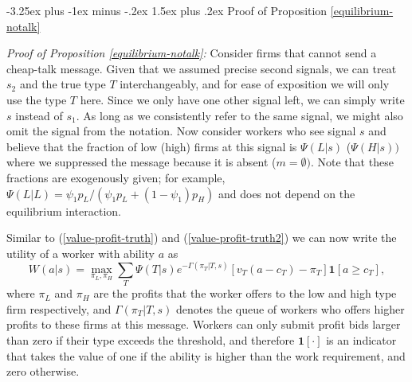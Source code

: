 \documentclass[12pt]{article}
\makeatletter
\renewcommand{\subsection}{%
  \@startsection{subsection}{2}{\z@}%
  {-3.25ex plus -1ex minus -.2ex}%
  {1.5ex plus .2ex}%
  {\normalfont\large\bfseries}%
}
\makeatother
\begin{document}
\subsection{Proof of Proposition \ref{equilibrium-notalk}}\label{online_app:proof_notalk}

\noindent \textit{Proof of Proposition \ref{equilibrium-notalk}:} Consider firms that
cannot send a cheap-talk message. Given that we assumed precise second
signals, we can treat $s_{2}$ and the true type $T$ interchangeably, and for
ease of exposition we will only use the type $T$ here. Since we only have
one other signal left, we can simply write $s$ instead of $s_{1}.$ As long
as we consistently refer to the same signal, we might also omit the signal
from the notation. Now consider workers who see signal $s$ and believe that
the fraction of low (high) firms at this signal is $\Psi (L|s)$ ($\Psi
(H|s)) $ where we suppressed the message because it is absent ($m=\emptyset
).$ Note that these fractions are exogenously given; for example, $\Psi
(L|L)=\psi _{1}p_{L}/(\psi _{1}p_{L}+(1-\psi _{1})p_{H})$
and does not depend on the equilibrium interaction.

Similar to (\ref{value-profit-truth}) and (\ref{value-profit-truth2}) we can
now write the utility of a worker with ability $a$ as%
\begin{equation}
W(a|s)=\max_{\pi _{L},\pi _{H}}\sum_{T}\Psi (T|s)e^{-\Gamma (\pi _{T}|T,s)} 
\left[ v_{T}(a-c_{T})-\pi _{T}\right] \boldsymbol{1}[a\geq c_{T}],
\label{objective-babbling}
\end{equation}%
where $\pi _{L}$ and $\pi _{H}$ are the profits that the worker offers to
the low and high type firm respectively, and $\Gamma (\pi _{T}|T,s)$ denotes
the queue of workers who offers higher profits to these firms at this
message. Workers can only submit profit bids larger than zero if their type
exceeds the threshold, and therefore $\boldsymbol{1[\cdot ]}$ is an
indicator that takes the value of one if the ability is higher than the work
requirement, and zero otherwise.
\end{document}
